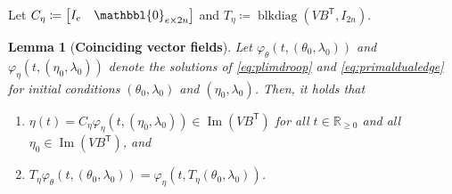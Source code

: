 \documentclass[twocolumn,twoside,journal]{IEEEtran}
\DeclareMathOperator{\blkdiag}{blkdiag}
\DeclareMathOperator{\Ima}{Im}
\newtheorem{lemma}{Lemma}
\begin{document}


Let $C_\eta \coloneqq \begin{bmatrix} I_e & \mathbbl{0}_{e \times 2n} \end{bmatrix}$ and $T_\eta \coloneqq \blkdiag(VB^\mathsf{T},I_{2n})$.

\begin{lemma}[\textbf{Coinciding vector fields}]\label{lem:coincide}
    Let $\varphi_{\theta}(t,(\theta_0,\lambda_0))$ and $\varphi_{\eta}(t,(\eta_0,\lambda_0))$ denote the solutions of \eqref{eq:plimdroop} and \eqref{eq:primaldualedge} for initial conditions $(\theta_0,\lambda_0)$ and $(\eta_0,\lambda_0)$. Then, it holds that
    \begin{enumerate}[label=(\roman*)]
        \item $\eta(t)=C_\eta \varphi_{\eta}(t,(\eta_0,\lambda_0)) \in \Ima(VB^\mathsf{T})$ for all $t \in \mathbb{R}_{\geq0}$ and all $\eta_0\in \Ima(VB^\mathsf{T})$, and \label{lem:coincide:invariant}
        \item $T_\eta \varphi_{\theta}(t,(\theta_0,\lambda_0))=\varphi_{\eta}(t,T_\eta(\theta_0,\lambda_0))$. \label{lem:coincide:solutions}
    \end{enumerate} 
\end{lemma}
\end{document}
